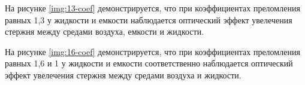 На рисунке \ref{img:13-coef} демонстрируется, что при коэффициентах преломления равных 1,3 у жидкости и емкости наблюдается оптический эффект увелечения стержня между средами воздуха, емкости и жидкости.

\begin{figure}[ht!]
\end{figure}
\FloatBarrier

На рисунке \ref{img:16-coef} демонстрируется, что при коэффициентах преломления равных 1,6 и 1 у жидкости и емкости соответственно наблюдается оптический эффект увелечения стержня между средами воздуха и жидкости.

\begin{figure}[ht!]
\end{figure}
\FloatBarrier


